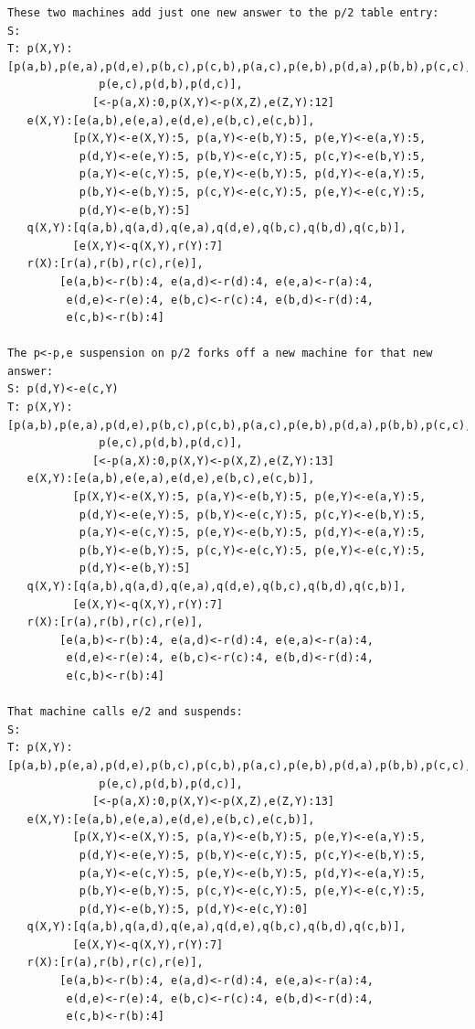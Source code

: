 \begin{verbatim}
These two machines add just one new answer to the p/2 table entry:
S:
T: p(X,Y):[p(a,b),p(e,a),p(d,e),p(b,c),p(c,b),p(a,c),p(e,b),p(d,a),p(b,b),p(c,c),
              p(e,c),p(d,b),p(d,c)],
             [<-p(a,X):0,p(X,Y)<-p(X,Z),e(Z,Y):12]
   e(X,Y):[e(a,b),e(e,a),e(d,e),e(b,c),e(c,b)],
          [p(X,Y)<-e(X,Y):5, p(a,Y)<-e(b,Y):5, p(e,Y)<-e(a,Y):5,
           p(d,Y)<-e(e,Y):5, p(b,Y)<-e(c,Y):5, p(c,Y)<-e(b,Y):5,
           p(a,Y)<-e(c,Y):5, p(e,Y)<-e(b,Y):5, p(d,Y)<-e(a,Y):5,
           p(b,Y)<-e(b,Y):5, p(c,Y)<-e(c,Y):5, p(e,Y)<-e(c,Y):5,
           p(d,Y)<-e(b,Y):5]
   q(X,Y):[q(a,b),q(a,d),q(e,a),q(d,e),q(b,c),q(b,d),q(c,b)],
          [e(X,Y)<-q(X,Y),r(Y):7]
   r(X):[r(a),r(b),r(c),r(e)],
        [e(a,b)<-r(b):4, e(a,d)<-r(d):4, e(e,a)<-r(a):4,
         e(d,e)<-r(e):4, e(b,c)<-r(c):4, e(b,d)<-r(d):4,
         e(c,b)<-r(b):4]

The p<-p,e suspension on p/2 forks off a new machine for that new answer:
S: p(d,Y)<-e(c,Y)
T: p(X,Y):[p(a,b),p(e,a),p(d,e),p(b,c),p(c,b),p(a,c),p(e,b),p(d,a),p(b,b),p(c,c),
              p(e,c),p(d,b),p(d,c)],
             [<-p(a,X):0,p(X,Y)<-p(X,Z),e(Z,Y):13]
   e(X,Y):[e(a,b),e(e,a),e(d,e),e(b,c),e(c,b)],
          [p(X,Y)<-e(X,Y):5, p(a,Y)<-e(b,Y):5, p(e,Y)<-e(a,Y):5,
           p(d,Y)<-e(e,Y):5, p(b,Y)<-e(c,Y):5, p(c,Y)<-e(b,Y):5,
           p(a,Y)<-e(c,Y):5, p(e,Y)<-e(b,Y):5, p(d,Y)<-e(a,Y):5,
           p(b,Y)<-e(b,Y):5, p(c,Y)<-e(c,Y):5, p(e,Y)<-e(c,Y):5,
           p(d,Y)<-e(b,Y):5]
   q(X,Y):[q(a,b),q(a,d),q(e,a),q(d,e),q(b,c),q(b,d),q(c,b)],
          [e(X,Y)<-q(X,Y),r(Y):7]
   r(X):[r(a),r(b),r(c),r(e)],
        [e(a,b)<-r(b):4, e(a,d)<-r(d):4, e(e,a)<-r(a):4,
         e(d,e)<-r(e):4, e(b,c)<-r(c):4, e(b,d)<-r(d):4,
         e(c,b)<-r(b):4]

That machine calls e/2 and suspends:
S: 
T: p(X,Y):[p(a,b),p(e,a),p(d,e),p(b,c),p(c,b),p(a,c),p(e,b),p(d,a),p(b,b),p(c,c),
              p(e,c),p(d,b),p(d,c)],
             [<-p(a,X):0,p(X,Y)<-p(X,Z),e(Z,Y):13]
   e(X,Y):[e(a,b),e(e,a),e(d,e),e(b,c),e(c,b)],
          [p(X,Y)<-e(X,Y):5, p(a,Y)<-e(b,Y):5, p(e,Y)<-e(a,Y):5,
           p(d,Y)<-e(e,Y):5, p(b,Y)<-e(c,Y):5, p(c,Y)<-e(b,Y):5,
           p(a,Y)<-e(c,Y):5, p(e,Y)<-e(b,Y):5, p(d,Y)<-e(a,Y):5,
           p(b,Y)<-e(b,Y):5, p(c,Y)<-e(c,Y):5, p(e,Y)<-e(c,Y):5,
           p(d,Y)<-e(b,Y):5, p(d,Y)<-e(c,Y):0]
   q(X,Y):[q(a,b),q(a,d),q(e,a),q(d,e),q(b,c),q(b,d),q(c,b)],
          [e(X,Y)<-q(X,Y),r(Y):7]
   r(X):[r(a),r(b),r(c),r(e)],
        [e(a,b)<-r(b):4, e(a,d)<-r(d):4, e(e,a)<-r(a):4,
         e(d,e)<-r(e):4, e(b,c)<-r(c):4, e(b,d)<-r(d):4,
         e(c,b)<-r(b):4]


\end{verbatim}

